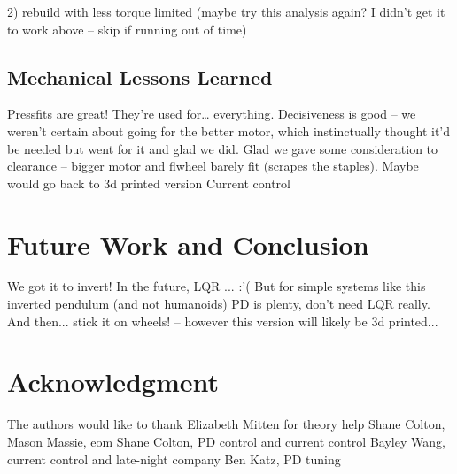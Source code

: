 \documentclass[conference]{IEEEtran}
\begin{document}
2) rebuild with less torque limited (maybe try this analysis again? I didn't get
it to work above -- skip if running out of time)




\subsection{Mechanical Lessons Learned}

Pressfits are great! They’re used for… everything.
Decisiveness is good – we weren’t certain about going for the better motor, which instinctually thought it’d be needed but went for it and glad we did.
Glad we gave some consideration to clearance – bigger motor and flwheel barely fit (scrapes the staples).
Maybe would go back to 3d printed version
Current control


\section{Future Work and Conclusion}

We got it to invert!
In the future, LQR ... :'( 
But for simple systems like this inverted pendulum (and not humanoids) PD is
plenty, don't need LQR really.
And then... stick it on wheels! -- however this version will likely be 3d
printed...
\section*{Acknowledgment}

The authors would like to thank Elizabeth Mitten for theory help
Shane Colton, Mason Massie, eom
Shane Colton, PD control and current control
Bayley Wang, current control and late-night company
Ben Katz, PD tuning







%
%
%
\end{document}
